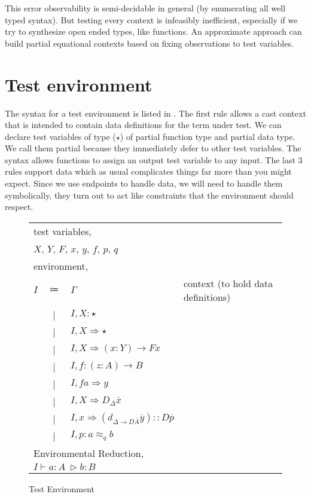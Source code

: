 This error observability is semi-decidable in general (by enumerating all well typed syntax).
But testing every context is infeasibly inefficient, especially if we try to synthesize open ended types, like functions.
An approximate approach can build partial equational contexts based on fixing observations to test variables.
 
 
\section{Test environment}
The syntax for a test environment is listed in .
The first rule allows a cast context that is intended to contain data definitions for the term under test.
We can declare test variables of type ($\star$) of partial function type and partial data type.
We call them partial because they immediately defer to other test variables.
The syntax allows functions to assign an output test variable to any input.
The last 3 rules support data which as usual complicates things far more than you might expect.
Since we use endpoints to handle data, we will need to handle them symbolically, they turn out to act like constraints that the environment should respect.

\begin{figure}
\begin{tabular}{lcll}
\multicolumn{4}{l}{test variables,}\tabularnewline
\multicolumn{4}{l}{$X$, $Y$, $F$, $x$, $y$, $f$, $p$, $q$}\tabularnewline
\multicolumn{4}{l}{environment,}\tabularnewline
$I$ & $\Coloneqq$ & $\varGamma$ & context (to hold data definitions)\tabularnewline
  & | & $I,X:\star$ & \tabularnewline
  & | & $I,X\Rightarrow\star$ & \tabularnewline
  & | & $I,X\Rightarrow\left(x:Y\right)\rightarrow Fx$ & \tabularnewline
  & | & $I,f:\left(z:A\right)\rightarrow B$ & \tabularnewline
  & | & $I,fa\Rightarrow y$ & \tabularnewline
  & | & $I,X\Rightarrow D_{\Delta}\overline{x}$ & \tabularnewline
  & | & $I,x\Rightarrow\left(d_{\Delta\rightarrow D\overline{A}}\overline{y}\right)::D\overline{p}$ & \tabularnewline
  & | & $I,p:a\approx_{q}b$ & \tabularnewline
\multicolumn{4}{l}{Environmental Reduction,}\tabularnewline
\multicolumn{4}{l}{$I\vdash  a:A\ \vartriangleright b:B$}\tabularnewline
\end{tabular}

\caption{Test Environment}
\label{fig:sym-env-obs}
\end{figure}

